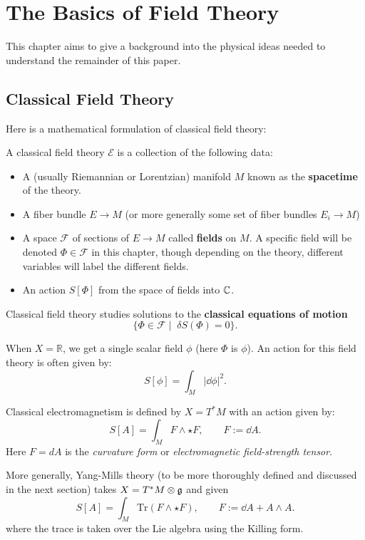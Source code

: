 \chapter{The Basics of Field Theory\label{ch:phys}}

	This chapter aims to give a background into the physical ideas needed to understand the remainder of this paper.
	
	\section{Classical Field Theory} %
	\label{sec:classical_field_theory}
	
	
	
	Here is a mathematical formulation of classical field theory:
	\begin{phys}
		A classical field theory $\mathcal E$ is a collection of the following data:
		\begin{itemize}
			\item A (usually Riemannian or Lorentzian) manifold $M$ known as the \textbf{spacetime} of the theory.
			\item A fiber bundle $E \to M$ (or more generally some set of fiber bundles $E_i \to M$)
			\item A space $\mathcal F$ of sections of $E \to M$ called \textbf{fields} on $M$. A specific field will be denoted $\Phi \in \mathcal F$ in this chapter, though depending on the theory, different variables will label the different fields.
			\item An action $S[\Phi]$ from the space of fields into $\mathbb{C}$.
		\end{itemize}
		Classical field theory studies solutions to the \textbf{classical equations of motion}
		$$\{\Phi \in \mathcal F \mid \; \delta S(\Phi) = 0 \}.$$
	\end{phys}
	\begin{eg}
		When $X = \mathbb R$, we get a single scalar field $\phi$ (here $\Phi$ is $\phi$). An action for this field theory is often given by:
		$$S[\phi] = \int_M |\dd \phi|^2.$$
	\end{eg}
	\begin{eg}
		Classical electromagnetism is defined by $X=T^* M$ with an action given by:
		$$S[A] = \int_M F \wedge \star F, \qquad F := \dd A.$$
		Here $F = dA$ is the \emph{curvature form} or \emph{electromagnetic field-strength tensor}.
		
		More generally, Yang-Mills theory (to be more thoroughly defined and discussed in the next section) takes $X=T^* M \otimes \frak g$ and given 
		$$S[A] = \int_M \mathrm{Tr}\left( F \wedge \star F \right), \qquad F := \dd A + A \wedge A.$$
		where the trace is taken over the Lie algebra using the Killing form. 
	\end{eg}
	
